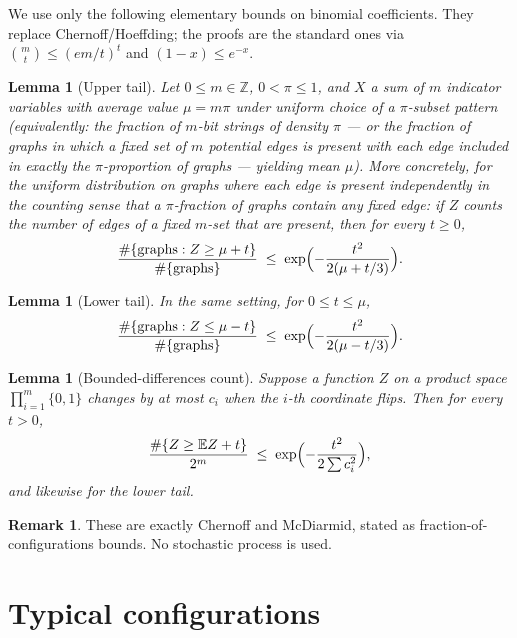 \documentclass[11pt]{article}
\newtheorem{lemma}[theorem]{Lemma}
\theoremstyle{definition}
\newtheorem{remark}[theorem]{Remark}
\newcommand{\bin}[2]{\binom{#1}{#2}}
\begin{document}
We use only the following elementary bounds on binomial coefficients.
They replace Chernoff/Hoeffding; the proofs are the standard ones via $\bin{m}{t}\le(em/t)^{t}$ and $(1-x)\le e^{-x}$.

\begin{lemma}[Upper tail]\label{lem:tail+}
Let $0\le m\in\mathbb{Z}$, $0<\pi\le 1$, and $X$ a sum of $m$ indicator variables with average value $\mu=m\pi$ under uniform choice of a $\pi$-subset pattern
(equivalently: the fraction of $m$-bit strings of density $\pi$ --- or the fraction of graphs in which a fixed set of $m$ potential edges is present with each edge included in exactly the $\pi$-proportion of graphs --- yielding mean $\mu$).
More concretely, for the uniform distribution on graphs where each edge is present independently in the counting sense that a $\pi$-fraction of graphs contain any fixed edge:
if $Z$ counts the number of edges of a fixed $m$-set that are present, then for every $t\ge 0$,
\[
  \frac{\#\{\text{graphs}: Z\ge\mu+t\}}{\#\{\text{graphs}\}}
  \;\le\;
  \exp\Bigl(-\frac{t^{2}}{2(\mu+t/3)}\Bigr).
\]
\end{lemma}

\begin{lemma}[Lower tail]\label{lem:tail-}
In the same setting, for $0\le t\le\mu$,
\[
  \frac{\#\{\text{graphs}: Z\le\mu-t\}}{\#\{\text{graphs}\}}
  \;\le\;
  \exp\Bigl(-\frac{t^{2}}{2(\mu-t/3)}\Bigr).
\]
\end{lemma}

\begin{lemma}[Bounded-differences count]\label{lem:mcd}
Suppose a function $Z$ on a product space $\prod_{i=1}^{m}\{0,1\}$ changes by at most $c_{i}$ when the $i$-th coordinate flips.
Then for every $t>0$,
\[
  \frac{\#\{Z\ge\mathbb{E}Z+t\}}{2^{m}}
  \;\le\;
  \exp\Bigl(-\frac{t^{2}}{2\sum c_{i}^{2}}\Bigr),
\]
and likewise for the lower tail.
\end{lemma}

\begin{remark}
These are exactly Chernoff and McDiarmid, stated as fraction-of-configurations bounds.
No stochastic process is used.
\end{remark}

\section{Typical configurations}
\end{document}
